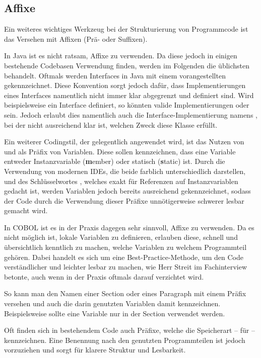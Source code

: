 \subsection*{Affixe} \label{affix}\label{affixCOBOL}
Ein weiteres wichtiges Werkzeug bei der Strukturierung von Programmcode ist das Versehen mit Affixen (Prä- oder Suffixen).

In Java ist es nicht ratsam, Affixe zu verwenden. Da diese jedoch in einigen bestehende Codebasen Verwendung finden, werden im Folgenden die üblichsten behandelt.
Oftmals werden Interfaces in Java mit einem vorangestellten  gekennzeichnet. Diese Konvention sorgt jedoch dafür, dass Implementierungen eines Interfaces namentlich nicht immer klar abgegrenzt und definiert sind. Wird beispielsweise ein Interface  definiert, so könnten valide Implementierungen  oder  sein. Jedoch erlaubt dies namentlich auch die Interface-Implementierung namens , bei der nicht ausreichend klar ist, welchen Zweck diese Klasse erfüllt.

Ein weiterer Codingstil, der gelegentlich angewendet wird, ist das Nutzen von  und  als Präfix von Variablen. Diese sollen kennzeichnen, dass eine Variable entweder Instanzvariable (\textbf{m}ember) oder statisch (\textbf{s}tatic) ist. Durch die Verwendung von modernen IDEs, die beide farblich unterschiedlich darstellen, und des Schlüsselwortes , welches exakt für Referenzen auf Instanzvariablen gedacht ist, werden Variablen jedoch bereits ausreichend gekennzeichnet, sodass der Code durch die Verwendung dieser Präfixe unnötigerweise schwerer lesbar gemacht wird.

In COBOL ist es in der Praxis dagegen sehr sinnvoll, Affixe zu verwenden. Da es nicht möglich ist, lokale Variablen zu definieren, erlauben diese, schnell und übersichtlich kenntlich zu machen, welche Variablen zu welchem Programmteil gehören. Dabei handelt es sich um eine Best-Practice-Methode, um den Code verständlicher und leichter lesbar zu machen, wie Herr Streit im Fachinterview betonte, auch wenn in der Praxis oftmals darauf verzichtet wird.

So kann man den Namen einer Section oder eines Paragraph mit einem Präfix versehen und auch die darin genutzten Variablen damit kennzeichnen. Beispielsweise sollte eine Variable  nur in der Section  verwendet werden. 

Oft finden sich in bestehendem Code auch Präfixe, welche die Speicherart -- \zB {} für  -- kennzeichnen. Eine Benennung nach den genutzten Programmteilen ist jedoch vorzuziehen und sorgt für klarere Struktur und Lesbarkeit.

